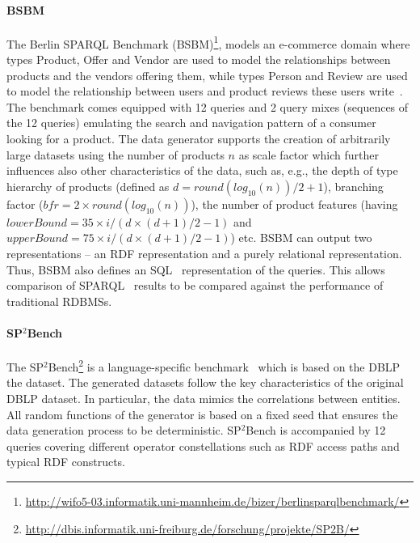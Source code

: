 \paragraph{BSBM} The Berlin SPARQL Benchmark (BSBM)\footnote{\url{http://wifo5-03.informatik.uni-mannheim.de/bizer/berlinsparqlbenchmark/}}, models an e-commerce domain where types Product, Offer and Vendor are used to model the relationships between products and the vendors offering them, while types Person and Review are used to model the relationship between users and product reviews these users write~\cite{Bizer09theberlin}.
The benchmark comes equipped with 12 queries and 2 query mixes (sequences of the 12 queries) emulating the search and navigation pattern of a consumer looking for a product. The data generator supports the creation of arbitrarily large datasets using the number of products $n$ as scale factor which further influences also other characteristics of the data, such as, e.g., the depth of type hierarchy of products (defined as $d = round(log_{10}(n))/2 + 1$), branching factor ($bfr = 2 \times round(log_{10}(n))$), the number of product features (having $lowerBound = 35 \times i / (d \times (d+1)/2 - 1)$ and $upperBound = 75 \times i / (d \times (d+1)/2 - 1)$) etc. BSBM can output two representations -- an RDF representation and a purely relational representation. Thus, BSBM also defines an SQL~\cite{sql} representation of the queries. This allows comparison of SPARQL~\cite{sparql} results  to be compared against the performance of traditional RDBMSs.


\paragraph{SP$^2$Bench} The SP$^2$Bench\footnote{\url{http://dbis.informatik.uni-freiburg.de/forschung/projekte/SP2B/}} is a language-specific benchmark~\cite{Schmidt2010} which is based on the DBLP  the dataset. %
The generated datasets follow the key characteristics of the original DBLP dataset. In particular, the data mimics the correlations between entities. All random functions of the generator is based on a fixed seed that ensures the data generation process to be deterministic. SP$^2$Bench is accompanied by 12 queries covering different operator constellations such as RDF access paths and typical RDF constructs.


